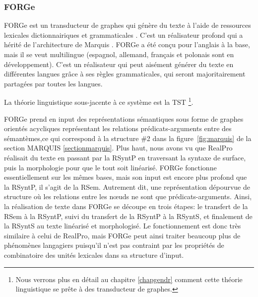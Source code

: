 \subsubsection{FORGe}
FORGe est un transducteur de graphes qui génère du texte à l'aide de ressources lexicales dictionnairiques et grammaticales \citep{MilledemoFORGePompeu2017,DBLP:conf/semeval/MilleCBW17}. C'est un réalisateur profond qui a hérité de l'architecture de Marquis \citep{WannerMARQUISGENERATIONUSERTAILORED2010}. FORGe a été conçu pour l'anglais à la base, mais il se veut multilingue (espagnol, allemand, français et polonais sont en développement). C'est un réalisateur qui peut aisément générer du texte en différentes langues grâce à ses règles grammaticales, qui seront majoritairement partagées par toutes les langues.

La théorie linguistique sous-jacente à ce système est la \ac{TST} \citep{melcuk1988, mel2012semantics, PolgueretheorieSensTexte1998, kahane05a, Milicevic2007ASG} \footnote{Nous verrons plus en détail au chapitre \ref{chapgendr} comment cette théorie linguistique se prête à des transducteur de graphes.}.

FORGe prend en input des représentations sémantiques sous forme de graphes orientés acycliques représentant les relations prédicats-arguments entre des sémantèmes,ce qui correspond à la structure \#2 dans la figure~\ref{fig:marquis} de la section MARQUIS \ref{sectionmarquis}. Plus haut, nous avons vu que RealPro \citep{LavoieFastPortableRealizer1997} réalisait du texte en passant par la \ac{RSyntP} en traversant la syntaxe de surface, puis la morphologie pour que le tout soit linéarisé. FORGe fonctionne essentiellement sur les mêmes bases, mais son input est encore plus profond que la \ac{RSyntP}, il s'agit de la \ac{RSem}. Autrement dit, une représentation dépourvue de structure où les relations entre les n\oe{}uds ne sont que prédicats-arguments. Ainsi, la réalisation de texte dans FORGe se découpe en trois étapes: le transfert de la \ac{RSem} à la \ac{RSyntP}, suivi du transfert de la \ac{RSyntP} à la \ac{RSyntS}, et finalement de la \ac{RSyntS} au texte linéarisé et morphologisé. Le fonctionnement est donc très similaire à celui de RealPro, mais FORGe peut ainsi traiter beaucoup plus de phénomènes langagiers puisqu'il n'est pas contraint par les propriétés de combinatoire des unités lexicales dans sa structure d'input.

